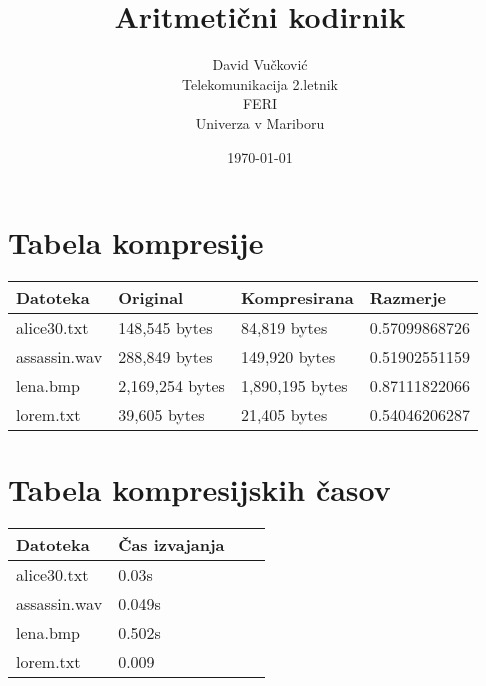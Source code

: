 \documentclass[12pt,a4paper]{article}
\title{\huge{\textbf{Aritmetični kodirnik}}}
\author{
        David Vučković \\
                Telekomunikacija 2.letnik\\
        FERI\\
        Univerza v Mariboru}
\date{\today}
\begin{document}
\maketitle
\thispagestyle{empty}

\clearpage %


\thispagestyle{empty}

\clearpage %

\section{Tabela kompresije} %

\begin{table}[H]
\begin{tabular}{llll}
    Datoteka     & Original & Kompresirana & Razmerje \\ \hline
    alice30.txt  & 148,545 bytes                & 84,819 bytes          & 0.57099868726           \\
    assassin.wav & 288,849 bytes                & 149,920 bytes         & 0.51902551159           \\
    lena.bmp     & 2,169,254 bytes              & 1,890,195 bytes             & 0.87111822066           \\
    lorem.txt    & 39,605 bytes                      & 21,405 bytes            & 0.54046206287           \\
\end{tabular}
\end{table}
\section{Tabela  kompresijskih časov}
\begin{table}[H]
    \begin{tabular}{llll}
    Datoteka     & Čas izvajanja \\ \hline
    alice30.txt  & 0.03s              \\
    assassin.wav & 0.049s                      \\
    lena.bmp     & 0.502s              \\
    lorem.txt    & 0.009                            \\
    \end{tabular}
\end{table}
\end{document}
